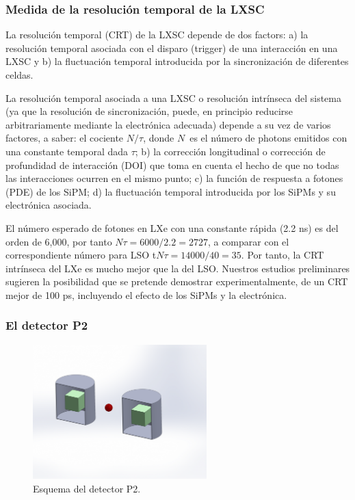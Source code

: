 \subsubsection*{Medida de la resolución temporal de la LXSC}

La resolución temporal (CRT) de la LXSC depende de dos factors: a) la resolución temporal asociada con el disparo (trigger) de una interacción en una LXSC y b) la fluctuación temporal introducida por la sincronización de diferentes celdas.

La resolución temporal asociada a una LXSC o resolución intrínseca del sistema (ya que la resolución de sincronización, puede, en principio reducirse arbitrariamente mediante la electrónica adecuada) depende a su vez de varios factores, a saber: el cociente $N/\tau$, donde $N$~es el número de photons emitidos con una constante temporal dada $\tau$; b) la corrección longitudinal o corrección de profundidad de interacción (DOI) que toma en cuenta el hecho de que no todas las interacciones ocurren en el mismo punto; c) la función de respuesta a fotones (PDE) de los SiPM; d) la fluctuación temporal introducida por los SiPMs y su electrónica asociada. 

El número esperado de fotones en LXe con una constante rápida (2.2 ns) es del orden de 6,000, por tanto  $N\tau = 6000/2.2 = 2727$, a comparar con el correspondiente número para LSO t$N\tau = 14000/40 = 35$. Por tanto, la CRT intrínseca del LXe es mucho mejor que la del LSO.  Nuestros estudios preliminares sugieren la posibilidad que se pretende demostrar experimentalmente, de un CRT  mejor de 100 ps, incluyendo el efecto de los SiPMs y la electrónica. 

\subsubsection*{El detector P2}

\begin{figure}
\centering
\includegraphics[width=0.6\textwidth]{img/P2.png}
\caption{\small Esquema del detector P2.} \label{fig.P2}
\end{figure} 

